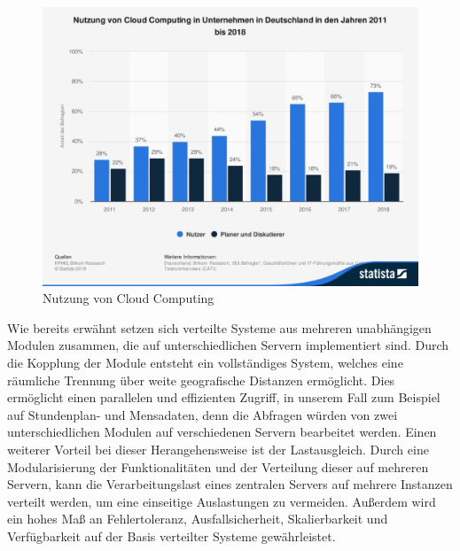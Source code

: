 \begin{figure}[H]
\centering
\includegraphics[width=\pictureWidth cm]{Bilder/Statistik/Statista_Cloud_Computing.pdf}
\caption{Nutzung von Cloud Computing\label{fig:cloud_statistic}\protect\footnotemark}
\end{figure}

Wie bereits erwähnt setzen sich verteilte Systeme aus mehreren unabhängigen Modulen zusammen, die auf unterschiedlichen Servern implementiert sind. Durch die Kopplung der Module entsteht ein vollständiges System, welches eine räumliche Trennung über weite geografische Distanzen ermöglicht. Dies ermöglicht einen parallelen und effizienten Zugriff, in unserem Fall zum Beispiel auf Stundenplan- und Mensadaten, denn die Abfragen würden von zwei unterschiedlichen Modulen auf verschiedenen Servern bearbeitet werden. Einen weiterer Vorteil bei dieser Herangehensweise ist der Lastausgleich. Durch eine Modularisierung der Funktionalitäten und der Verteilung dieser auf mehreren Servern, kann die Verarbeitungslast eines zentralen Servers auf mehrere Instanzen verteilt werden, um eine einseitige Auslastungen zu vermeiden. Außerdem wird ein hohes Maß an Fehlertoleranz, Ausfallsicherheit, Skalierbarkeit und Verfügbarkeit auf der Basis verteilter Systeme gewährleistet\autocite[Vgl.][5\psq]{verteiltesys}.

